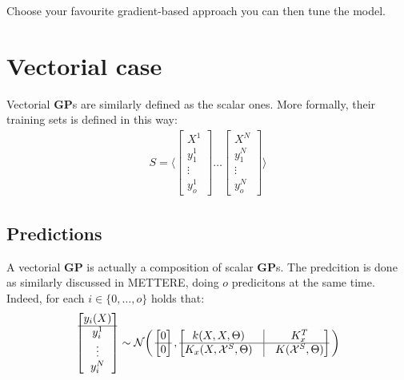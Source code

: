 \documentclass{article}
\begin{document}
Choose your favourite gradient-based approach you can then tune the model.

\section{Vectorial case}

Vectorial \textbf{GP}s are similarly defined as the scalar ones.
More formally, their training sets is defined in this way:
\begin{eqnarray}
S = \bigg \langle
\begin{bmatrix} X^1 \\ \hline y^1_1 \\ \vdots \\ y^1_o \end{bmatrix} 
\hdots
\begin{bmatrix} X^N \\ \hline y^N_1 \\ \vdots \\ y^N_o \end{bmatrix} 
\bigg \rangle
\end{eqnarray}

\subsection{Predictions}

A vectorial \textbf{GP} is actually a composition of scalar \textbf{GP}s.
The predcition is done as similarly discussed in METTERE, doing $o$ predicitons at the same time. Indeed, for each $i \in \lbrace 0, \hdots ,o \rbrace$ holds that:
\begin{eqnarray}
\begin{bmatrix} y_i(X) \\ \hline y_i^1 \\ \vdots \\ y_i^N \\ \end{bmatrix} \sim
\mathcal{N} \bigg ( 
\begin{bmatrix} 0 \\ \hline 0 \end{bmatrix},
\begin{bmatrix}
k(X,X, \Theta) & \vline & K_x^T \\ 
\hline
K_x(X, \mathcal{X}^S, \Theta) & \vline & K(\mathcal{X}^S, \Theta)
\end{bmatrix}
\bigg )
\end{eqnarray}
\end{document}
